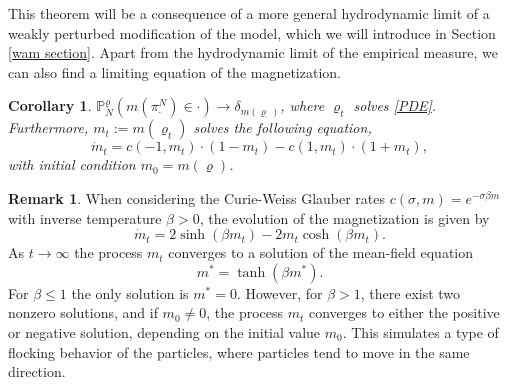 \documentclass[11pt]{article}
\numberwithin{equation}{section}
\theoremstyle{definition}
\newtheorem{Remark}{Remark}[section]
\theoremstyle{plain}
\newtheorem{Corollary}[Theorem]{Corollary}
\newcommand{\p}{\mathbb{P}}
\begin{document}
This theorem will be a consequence of a more general hydrodynamic limit of a weakly perturbed modification of the model, which we will introduce in Section \ref{wam section}. Apart from the hydrodynamic limit of the empirical measure, we can also find a limiting equation of the magnetization.

\begin{Corollary}\label{mag hydro}
    $\p^\varrho_N(m(\pi^N_{\cdot})\in \cdot) \to \delta_{m(\varrho_\cdot)}$, where $\varrho_t$ solves \eqref{PDE}. Furthermore, $m_t := m(\varrho_t)$ solves the following equation, 
    \begin{equation}\label{mag-PDE}
        \dot{m}_t =  c(-1,m_t)\cdot  (1-m_t)-c(1,m_t) \cdot (1+m_t),
    \end{equation}
    with initial condition  $m_0 = m(\varrho)$.
\end{Corollary}
\begin{Remark}
    When considering the Curie-Weiss Glauber rates $c(\sigma,m) = e^{-\sigma \beta m}$ with inverse temperature $\beta>0$, the evolution of the magnetization is given by 
        \begin{equation}
            \dot{m}_t = 2\sinh(\beta m_t) -2m_t\cosh(\beta m_t).
        \end{equation}
    As $t\to\infty$ the process $m_t$ converges to a solution of the mean-field equation 
        \begin{equation}
            m^* = \tanh(\beta m^*). 
        \end{equation}
    For $\beta\leq 1$ the only solution is $m^*=0$. However, for $\beta>1$, there exist two nonzero solutions, and if $m_0\neq 0$, the process $m_t$ converges to either the  positive or negative solution, depending on the initial value $m_0$. This simulates a type of flocking behavior of the particles, where particles tend to move in the same direction. 
\end{Remark}
\end{document}
